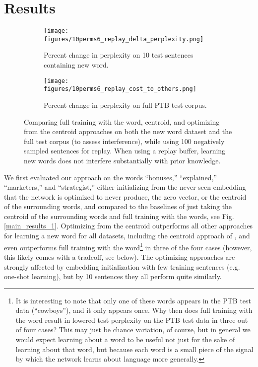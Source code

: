 \documentclass{article}
\begin{document}
\section{Results}
\begin{figure}
\centering
\begin{subfigure}[b]{\textwidth}
\texttt{[image: figures/10perms6\_replay\_delta\_perplexity.png]}
\caption{Percent change in perplexity on 10 test sentences containing new word.}
\end{subfigure}
\begin{subfigure}[b]{\textwidth}
\texttt{[image: figures/10perms6\_replay\_cost\_to\_others.png]}
\caption{Percent change in perplexity on full PTB test corpus.}
\end{subfigure}
\caption{Comparing full training with the word, centroid, and optimizing from the centroid approaches on both the new word dataset and the full test corpus (to assess interference), while using 100 negatively sampled sentences for replay. When using a replay buffer, learning new words does not interfere substantially with prior knowledge.}
\label{ameliorating_interference_fig}
\end{figure}
We first evaluated our approach on the words ``bonuses,'' ``explained,'' ``marketers,'' and ``strategist,'' either initializing from the never-seen embedding that the network is optimized to never produce, the zero vector, or the centroid of the surrounding words, and compared to the baselines of just taking the centroid of the surrounding words and full training with the words, see Fig. \ref{main_results_1}. Optimizing from the centroid outperforms all other approaches for learning a new word for all datasets, including the centroid approach of \citet{Lazaridou2017}, and even outperforms full training with the word\footnote{It is interesting to note that only one of these words appears in the PTB test data (``cowboys''), and it only appears once. Why then does full training with the word result in lowered test perplexity on the PTB test data in three out of four cases? This may just be chance variation, of course, but in general we would expect learning about a word to be useful not just for the sake of learning about that word, but because each word is a small piece of the signal by which the network learns about language more generally.} in three of the four cases (however, this likely comes with a tradeoff, see below). The optimizing approaches are strongly affected by embedding initialization with few training sentences (e.g. one-shot learning), but by 10 sentences they all perform quite similarly. \par
\end{document}
